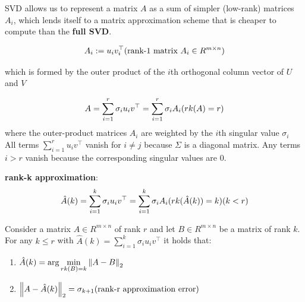 SVD allows us to represent a matrix $A$ as a sum of simpler (low-rank) matrices $A_i$, which lends itself to a matrix approximation scheme that is cheaper to compute than the \textbf{full SVD}.

\[
    A_i := u_iv_i^\top \hfill \text{(rank-$1$ matrix $A_i \in R^{m\times n}$)}
\]

which is formed by the outer product of the $i$th orthogonal column vector of $U$ and $V$

\[
    \displaystyle
    A = 
    \sum_{i=1}^{r} \sigma_iu_iv^\top
    =
    \sum_{i=1}^{r} \sigma_iA_i
    \hfill
    (rk(A)=r)
\]
where the outer-product matrices $A_i$ are weighted by the $i$th singular value $\sigma_i$\\
All terms $\displaystyle \sum_{i=1}^{r} u_iv^\top$ vanish for $i \neq j$ because $\Sigma$ is a diagonal matrix. Any terms $i > r$ vanish because the corresponding singular values are $0$.

\vspace{0.2cm}
\textbf{rank-k approximation}:
\[
    \displaystyle
    \hat{A}(k) = 
    \sum_{i=1}^{k} \sigma_iu_iv^\top
    =
    \sum_{i=1}^{k} \sigma_iA_i
    \hfill
    (rk(\hat{A}(k))=k)
    (k < r)
\]

\begin{theorem}
    Consider a matrix $A \in R^{m\times n}$ of rank $r$ and let $B \in R^{m\times n}$ be a matrix of rank $k$. For any $k \leq r$ with $\hat{A}(k) = \sum_{i=1}^{k} \sigma_iu_iv^\top$ it holds that:
    \begin{enumerate}
        \item $\displaystyle \hat{A}(k) = \arg\min_{rk(B)=k} \left\| A-B \right\|_2$

        \item $\displaystyle \dnorm{A-\hat{A}(k)}_2 = \sigma_{k+1} \hfill (\text{rank-r approximation error})$
    \end{enumerate}
\end{theorem}

